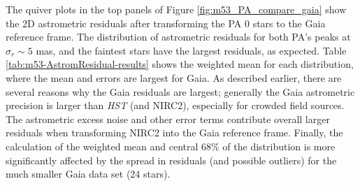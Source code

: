 \documentclass[]{spie}  %
\begin{document}
\indent The quiver plots in the top panels of Figure \ref{fig:m53_PA_compare_gaia} show the 2D astrometric residuals after transforming the PA 0 stars to the Gaia reference frame. The distribution of astrometric residuals for both PA's peaks at $\sigma_{r}{\sim}5$ mas, and the faintest stars have the largest residuals, as expected. Table \ref{tab:m53-AstromResidual-results} shows the weighted mean for each distribution, where the mean and errors are largest for Gaia. As described earlier, there are several reasons why the Gaia residuals are largest; generally the Gaia astrometric precision is larger than \textit{HST} (and NIRC2), especially for crowded field sources. The astrometric excess noise and other error terms contribute overall larger residuals when transforming NIRC2 into the Gaia reference frame. Finally, the calculation of the weighted mean and central 68\% of the distribution is more significantly affected by the spread in residuals (and possible outliers) for the much smaller Gaia data set (24 stars).

\end{document}
